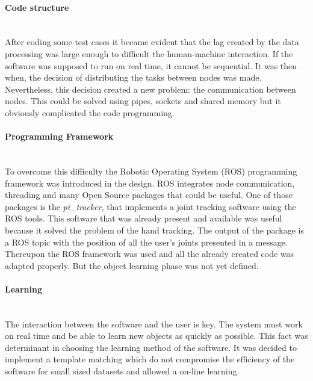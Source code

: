 \paragraph{Code structure}
\mbox{} \\

After coding some test cases it became evident that the lag created by the data processing was large enough to difficult the human-machine interaction. 
If the software was supposed to run on real time, it cannot be sequential. 
It was then when, the decision of distributing the tasks between nodes was made. 
Nevertheless, this decision created a new problem: the communication between nodes. 
This could be solved using pipes, sockets and shared memory but it obviously complicated the code programming. 
\\


\paragraph{Programming Framework}
\mbox{} \\

To overcome this difficulty the Robotic Operating System (ROS) programming framework was introduced in the design.
ROS integrates node communication, threading and many Open Source packages that could be useful. 
One of those packages is the \textit{pi\_tracker}, that implements a joint tracking software using the ROS tools. 
This software that was already present and available was useful because it solved the problem of the hand tracking. 
The output of the package is a ROS topic with the position of all the user's joints presented in a message. 
\\

Thereupon the ROS framework was used and all the already created code was adapted properly. 
But the object learning phase was not yet defined. 
\\


\paragraph{Learning}
\mbox{} \\

The interaction between the software and the user is key. 
The system must work on real time and be able to learn new objects as quickly as possible. 
This fact was determinant in choosing the learning method of the software. 
It was decided to implement a template matching which do not compromise the efficiency of the software for small sized datasets and allowed a on-line learning. 
\\

